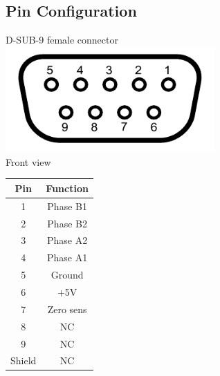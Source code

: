 \documentclass[a4paper, final, 12pt, oneside]{scrartcl}
\numberwithin{equation}{section}
\numberwithin{table}{section}
\numberwithin{figure}{section}
\begin{document}
\subsection*{Pin Configuration}
\begin{minipage}{\textwidth}
  \begin{minipage}[b]{0.49\textwidth}
    \centering
    D-SUB-9 female connector\\
    \includegraphics[width=0.6\textwidth]{./drawings/Numbered_DE9_female_Diagram.pdf}\\
    Front view
  \end{minipage}
  \hfill
  \begin{minipage}[b]{0.49\textwidth}
    \centering
    \begin{tabular}{cc}
      \toprule
      \textbf{Pin} & \textbf{Function} \\
      \toprule
      1 & Phase B1 \\ \midrule
      2 & Phase B2\\ \midrule
      3 & Phase A2 \\ \midrule
      4 & Phase A1 \\ \midrule
      5 & Ground \\ \midrule
      6 & +5V \\ \midrule
      7 & Zero sens \\ \midrule
      8 & NC \\ \midrule
      9 & NC \\ \midrule
      Shield & NC \\
      \bottomrule
    \end{tabular}
  \end{minipage}
\end{minipage}
\FloatBarrier
\end{document}
